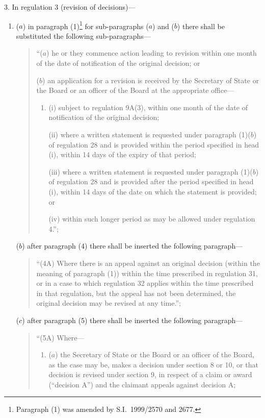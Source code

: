 \documentclass[12pt,a4paper]{article}
\begin{document}
\medskip

3.  In regulation 3 (revision of decisions)—
\begin{enumerate}\item[]
($a$) in paragraph (1)\footnote{Paragraph (1) was amended by S.I.\ 1999/2570 and 2677.} for sub-paragraphs ($a$)  and ($b$)  there shall be substituted the following sub-paragraphs—
\begin{quotation}
“($a$) he or they commence action leading to revision within one month of the date of notification of the original decision; or

($b$) an application for a revision is received by the Secretary of State or the Board or an officer of the Board at the appropriate office—
\begin{enumerate}\item[]
(i) subject to regulation 9A(3), within one month of the date of notification of the original decision;

(ii) where a written statement is requested under paragraph (1)($b$)  of regulation 28 and is provided within the period specified in head (i), within 14 days of the expiry of that period;

(iii) where a written statement is requested under paragraph (1)($b$)  of regulation 28 and is provided after the period specified in head (i), within 14 days of the date on which the statement is provided; or

(iv) within such longer period as may be allowed under regulation 4.”;
\end{enumerate}
\end{quotation}

($b$) after paragraph (4) there shall be inserted the following paragraph—
\begin{quotation}
“(4A) Where there is an appeal against an original decision (within the meaning of paragraph (1)) within the time prescribed in regulation 31, or in a case to which regulation 32 applies within the time prescribed in that regulation, but the appeal has not been determined, the original decision may be revised at any time.”;
\end{quotation}

($c$) after paragraph (5) there shall be inserted the following paragraph—
\begin{quotation}
“(5A) Where—
\begin{enumerate}\item[]
($a$) the Secretary of State or the Board or an officer of the Board, as the case may be, makes a decision under section 8 or 10, or that decision is revised under section 9, in respect of a claim or award (“decision A”) and the claimant appeals against decision A;


\end{enumerate}
\end{quotation}
\end{enumerate}
\end{document}
